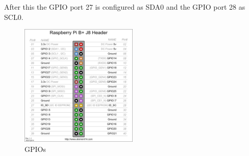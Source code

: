 After this the GPIO port 27 is configured as SDA0 and the GPIO port 28 as SCL0.

\begin{figure}[H]
	\centering\includegraphics[width=0.5\textwidth]{fig/gpios}
	\caption{GPIOs \footnotemark}
	\label{fig:gpios}
\end{figure}
\newpage







